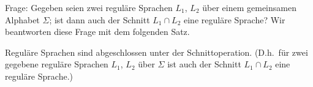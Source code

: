 %                 


Frage: Gegeben seien zwei reguläre Sprachen $L_1$, $L_2$ über einem gemeinsamen Alphabet $\Sigma$; ist dann auch der Schnitt $L_1\cap L_2$ eine reguläre Sprache? Wir beantworten diese Frage mit dem folgenden Satz.

\begin{Satz}\label{satz:2.ClosedIntersection}
  Reguläre Sprachen sind abgeschlossen unter der Schnittoperation. (D.h.\ für zwei gegebene reguläre Sprachen $L_1$, $L_2$ über $\Sigma$ ist auch der Schnitt $L_1\cap L_2$ eine reguläre Sprache.)
\end{Satz}

